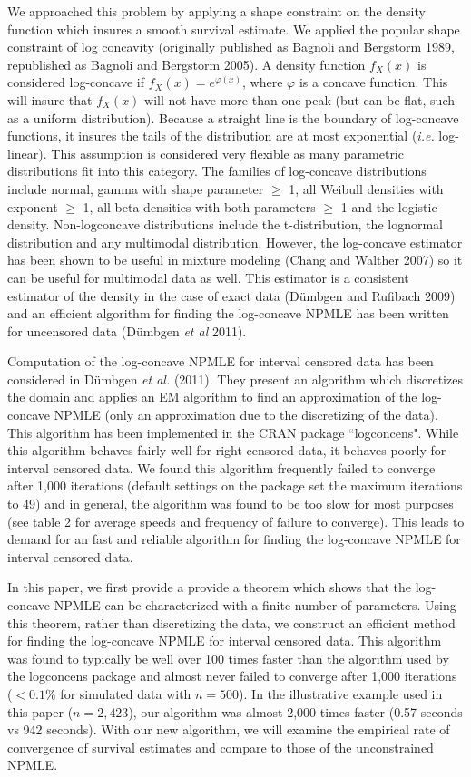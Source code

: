 \documentclass[10pt]{article}
\begin{document}
	We approached this problem by applying a shape constraint on the density function which insures a smooth survival estimate. We applied the popular shape constraint of log concavity (originally published as Bagnoli and Bergstorm 1989, republished as Bagnoli and Bergstorm 2005). A density function $f_X(x)$ is considered log-concave if $f_X(x) = e^{\varphi(x)}$, where $\varphi$ is a concave function. This will insure that $f_X(x)$ will not have more than one peak (but can be flat, such as a uniform distribution). Because a straight line is the boundary of log-concave functions, it insures the tails of the distribution are at most exponential (\emph{i.e.} log-linear). This assumption is considered very flexible as many parametric distributions fit into this category. The families of log-concave distributions include normal, gamma with shape parameter $\ge$ 1, all Weibull densities with exponent $\ge$ 1, all beta densities with both parameters $\ge$ 1 and the logistic density. Non-logconcave distributions include the t-distribution, the lognormal distribution and any multimodal distribution. However, the log-concave estimator has been shown to be useful in mixture modeling (Chang and Walther 2007) so it can be useful for multimodal data as well. This estimator is a consistent estimator of the density in the case of exact data (D\"umbgen and Rufibach 2009) and an efficient algorithm for finding the log-concave NPMLE has been written for uncensored data (D\"umbgen \emph{et al} 2011). 

	Computation of the log-concave NPMLE for interval censored data has been considered in D\"umbgen \emph{et al.} (2011). They present an algorithm which discretizes the domain and  applies an EM algorithm to find an approximation of the log-concave NPMLE (only an approximation due to the discretizing of the data). This algorithm has been implemented in the CRAN package ``logconcens". While this algorithm behaves fairly well for right censored data, it behaves poorly for interval censored data. We found this algorithm frequently failed to converge after 1,000 iterations (default settings on the package set the maximum iterations to 49) and in general, the algorithm was found to be too slow for most purposes (see table 2 for average speeds and frequency of failure to converge). This leads to demand for an fast and reliable algorithm for finding the log-concave NPMLE for interval censored data. 
		
	In this paper, we first provide a  provide a theorem which shows that the log-concave NPMLE can be characterized with a finite number of parameters. Using this theorem, rather than discretizing the data, we construct an efficient method for finding the log-concave NPMLE for interval censored data. This algorithm was found to typically be well over 100 times faster than the algorithm used by the logconcens package and almost never failed to converge after 1,000 iterations ($< 0.1\%$ for simulated data with $n = 500$). In the illustrative example used in this paper ($n = 2,423$), our algorithm was almost 2,000 times faster (0.57 seconds vs 942 seconds). With our new algorithm, we will examine the empirical rate of convergence of survival estimates and compare to those of the unconstrained NPMLE. 
	
\end{document}
